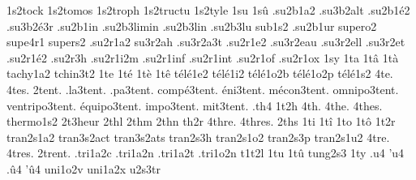 {                    1s2tock
                    1s2tomos
                    1s2troph
                    1s2tructu
                    1s2tyle
1su
1s\^u
                    .su2b1a2
                    .su3b2alt
                    .su2b1\'e2
                    .su3b2\'e3r
                    .su2b1in
                    .su2b3limin
                    .su2b3lin
                    .su2b3lu
                    sub1s2
                    .su2b1ur
                    supero2
                    supe4r1
                    supers2
                    .su2r1a2
                    su3r2ah
                    .su3r2a3t
                    .su2r1e2
                    .su3r2eau
                    .su3r2ell
                    .su3r2et
                    .su2r1\'e2
                    .su2r3h
                    .su2r1i2m
                    .su2r1inf
                    .su2r1int
                    .su2r1of
                    .su2r1ox
1sy
1ta
1t\^a
1t\`a
                    tachy1a2
                    tchin3t2
1te
1t\'e
1t\`e
1t\^e
                    t\'el\'e1e2
                    t\'el\'e1i2
                    t\'el\'e1o2b
                    t\'el\'e1o2p
                    t\'el\'e1s2
4te.
4tes.
        2tent. %
     .la3tent.
     .pa3tent.
 comp\'e3tent.
   \'eni3tent.
 m\'econ3tent.
  omnipo3tent.
ventripo3tent.
\'equipo3tent.
    impo3tent.
     mit3tent.
%
.th4
1t2h
4th.
4the.
4thes.
                    thermo1s2
                    2t3heur
2thl %
2thm
2thn
th2r
4thre.
4thres.
2ths
1ti
1t\^i
1to
1t\^o
1t2r
                    tran2s1a2
                    tran3s2act
                    tran3s2ats
                    tran2s3h
                    tran2s1o2
                    tran2s3p
                    tran2s1u2
4tre.
4tres.
2trent. %
                    .tri1a2c
                    .tri1a2n
                    .tri1a2t
                    .tri1o2n
                    t1t2l
1tu
1t\^u
tung2s3
1ty
.u4
'u4
.\^u4
'\^u4
                    uni1o2v
                    uni1a2x
                    u2s3tr
}
